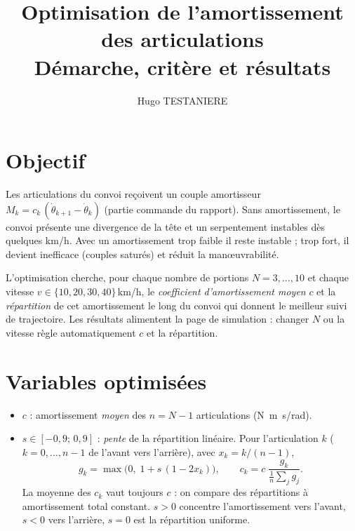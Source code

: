 \documentclass[a4paper,11pt]{article}
\title{\textbf{Optimisation de l'amortissement des articulations}\\[2mm]
\large Démarche, critère et résultats}
\author{Hugo TESTANIERE}
\date{}
\begin{document}
\maketitle
\tableofcontents

\section{Objectif}
Les articulations du convoi reçoivent un couple amortisseur $M_k=c_k\,(\dot\theta_{k+1}-\dot\theta_k)$ (partie commande du rapport). Sans amortissement, le convoi présente une divergence de la tête et un serpentement instables dès quelques km/h. Avec un amortissement trop faible il reste instable ; trop fort, il devient inefficace (couples saturés) et réduit la manœuvrabilité.

L'optimisation cherche, pour chaque nombre de portions $N=3,\dots,10$ et chaque vitesse $v\in\{10,20,30,40\}$\,km/h, le \emph{coefficient d'amortissement moyen} $c$ et la \emph{répartition} de cet amortissement le long du convoi qui donnent le meilleur suivi de trajectoire. Les résultats alimentent la page de simulation : changer $N$ ou la vitesse règle automatiquement $c$ et la répartition.

\section{Variables optimisées}
\begin{itemize}
  \item $c$ : amortissement \emph{moyen} des $n=N-1$ articulations (\si{N.m.s/rad}).
  \item $s\in[-0{,}9;\,0{,}9]$ : \emph{pente} de la répartition linéaire. Pour l'articulation $k$ ($k=0,\dots,n-1$ de l'avant vers l'arrière), avec $x_k=k/(n-1)$,
  \begin{equation}
    g_k=\max\big(0,\;1+s\,(1-2x_k)\big),\qquad
    c_k=c\;\frac{g_k}{\frac1n\sum_j g_j}.
  \end{equation}
  La moyenne des $c_k$ vaut toujours $c$ : on compare des répartitions à amortissement total constant. $s>0$ concentre l'amortissement vers l'avant, $s<0$ vers l'arrière, $s=0$ est la répartition uniforme.
\end{itemize}
\end{document}
